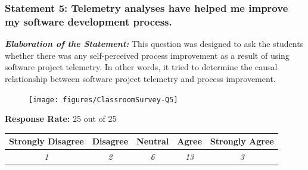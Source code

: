 

\clearpage
\subsubsection{Statement 5: Telemetry analyses have helped me improve my software development process.}

\textbf{\textit{Elaboration of the Statement:}}
This question was designed to ask the students whether there was any self-perceived process improvement as a result of using software project telemetry. In other words, it tried to determine the causal relationship between software project telemetry and process improvement.


\begin{quote}\end{quote} %

\begin{figure}[h]
  \center
  \texttt{[image: figures/ClassroomSurvey-Q5]}
  \label{fig:InClassSurvey-Q5}
\end{figure}

\begin{center}\textbf{Response Rate:} 25 out of 25\end{center}
\begin{table}[h]
	\centering
		\begin{tabular}{|c|c|c|c|c|} 
			\hline
			\textbf{Strongly Disagree} & \textbf{Disagree} & \textbf{Neutral} & \textbf{Agree} & \textbf{Strongly Agree} \\
			\hline
			\textit{1} & \textit{2} & \textit{6} & \textit{13} &\textit{3} \\
			\hline
		\end{tabular}
	\label{table:InClassSurvey-Q5}
\end{table}

